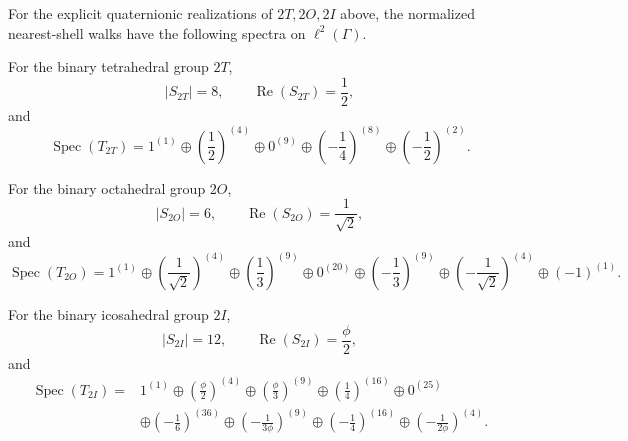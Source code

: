 \documentclass[11pt]{article}
\begin{document}
\begin{theorem}
\label{p1:thm:exceptional-nearest-shell-spectra}
For the explicit quaternionic realizations of \(2T,2O,2I\) above, the normalized
nearest-shell walks have the following spectra on \(\ell^2(\Gamma)\).

For the binary tetrahedral group \(2T\),
\[
    |S_{2T}|=8,\qquad \operatorname{Re}(S_{2T})=\frac12,
\]
and
\[
\operatorname{Spec}(T_{2T})
=
1^{(1)}
\oplus
\left(\frac12\right)^{(4)}
\oplus
0^{(9)}
\oplus
\left(-\frac14\right)^{(8)}
\oplus
\left(-\frac12\right)^{(2)} .
\]

For the binary octahedral group \(2O\),
\[
    |S_{2O}|=6,\qquad \operatorname{Re}(S_{2O})=\frac{1}{\sqrt2},
\]
and
\[
\operatorname{Spec}(T_{2O})
=
1^{(1)}
\oplus
\left(\frac1{\sqrt2}\right)^{(4)}
\oplus
\left(\frac13\right)^{(9)}
\oplus
0^{(20)}
\oplus
\left(-\frac13\right)^{(9)}
\oplus
\left(-\frac1{\sqrt2}\right)^{(4)}
\oplus
(-1)^{(1)} .
\]

For the binary icosahedral group \(2I\),
\[
    |S_{2I}|=12,\qquad \operatorname{Re}(S_{2I})=\frac{\phi}{2},
\]
and
\[
\begin{aligned}
\operatorname{Spec}(T_{2I})
={}&
1^{(1)}
\oplus
\left(\frac{\phi}{2}\right)^{(4)}
\oplus
\left(\frac{\phi}{3}\right)^{(9)}
\oplus
\left(\frac14\right)^{(16)}
\oplus
0^{(25)}
\\
&\oplus
\left(-\frac16\right)^{(36)}
\oplus
\left(-\frac{1}{3\phi}\right)^{(9)}
\oplus
\left(-\frac14\right)^{(16)}
\oplus
\left(-\frac{1}{2\phi}\right)^{(4)} .
\end{aligned}
\]
\end{theorem}
\end{document}

